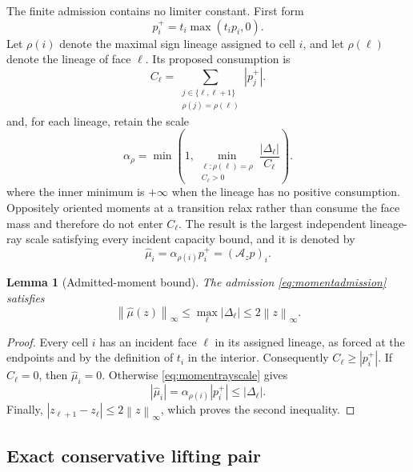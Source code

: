 \documentclass[journal]{IEEEtran}
\newtheorem{lemma}{Lemma}
\newcommand{\Acal}{\mathcal{A}}
\newcommand{\norm}[1]{\left\lVert#1\right\rVert}
\begin{document}
The finite admission contains no limiter constant. First form
\begin{equation}
p_i^+=t_i\max(t_ip_i,0).
 \label{eq:momentorthant}
\end{equation}
Let \(\rho(i)\) denote the maximal sign lineage assigned to cell \(i\), and
let \(\rho(\ell)\) denote the lineage of face \(\ell\). Its proposed
consumption is
\begin{equation}
 C_\ell=\sum_{\substack{j\in\{\ell,\ell+1\}\\
                        \rho(j)=\rho(\ell)}}|p_j^+|.
 \label{eq:momentconsumption}
\end{equation}
and, for each lineage, retain the scale
\begin{equation}
\alpha_\rho=\min\left(
 1,\min_{\substack{\ell:\rho(\ell)=\rho\\C_\ell>0}}
 \frac{|\Delta_\ell|}{C_\ell}\right).
 \label{eq:momentrayscale}
\end{equation}
where the inner minimum is \(+\infty\) when the lineage has no positive
consumption. Oppositely oriented moments at a transition relax rather than
consume the face mass and therefore do not enter \(C_\ell\). The result is the
largest independent lineage-ray scale satisfying every incident capacity
bound, and it is denoted by
\begin{equation}
 \widehat\mu_i=\alpha_{\rho(i)}p_i^+=(\Acal_zp)_i.
 \label{eq:momentadmission}
\end{equation}

\begin{lemma}[Admitted-moment bound]
The admission \eqref{eq:momentadmission} satisfies
\begin{equation}
 \norm{\widehat\mu(z)}_\infty\leq
 \max_\ell|\Delta_\ell|\leq2\norm z_\infty.
 \label{eq:admittedmomentbound}
\end{equation}
\end{lemma}

\begin{proof}
Every cell \(i\) has an incident face \(\ell\) in its assigned lineage, as
forced at the endpoints and by the definition of \(t_i\) in the interior.
Consequently \(C_\ell\geq|p_i^+|\). If \(C_\ell=0\), then
\(\widehat\mu_i=0\). Otherwise
\eqref{eq:momentrayscale} gives
\[
 |\widehat\mu_i|
 =\alpha_{\rho(i)}|p_i^+|
 \leq|\Delta_\ell|.
\]
Finally, \(|z_{\ell+1}-z_\ell|\leq2\norm z_\infty\), which proves the second
inequality.
\end{proof}

\subsection{Exact conservative lifting pair}
\end{document}
